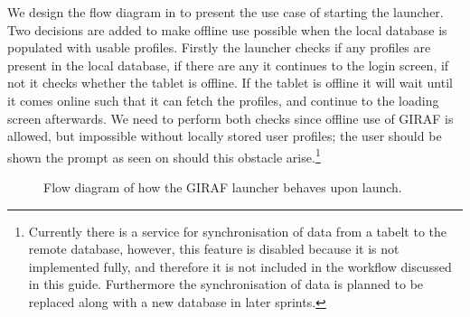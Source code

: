 We design the flow diagram in  to present the use case of starting the launcher. 
Two decisions are added to make offline use possible when the local database is populated with usable profiles.
Firstly the launcher checks if any profiles are present in the local database, if there are any it continues to the login screen, if not it checks whether the tablet is offline. 
If the tablet is offline it will wait until it comes online such that it can fetch the profiles, and continue to the loading screen afterwards.
We need to perform both checks since offline use of GIRAF is allowed, but impossible without locally stored user profiles; the user should be shown the prompt as seen on  should this obstacle arise.\footnote{Currently there is a service for synchronisation of data from a tabelt to the remote database, however, this feature is disabled because it is not implemented fully, and therefore it is not included in the workflow discussed in this guide. Furthermore the synchronisation of data is planned to be replaced along with a new database in later sprints.}

\begin{figure}[h]
    \centering
    
    \caption{Flow diagram of how the GIRAF launcher behaves upon launch.}\label{fig:launcher_offline_flow}
\end{figure}

